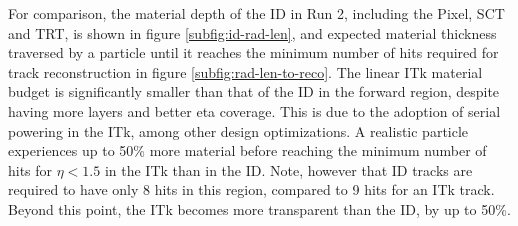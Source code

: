 For comparison, the material depth of the ID in Run 2, including the Pixel, SCT and TRT, is shown in figure \ref{subfig:id-rad-len}, and expected material thickness traversed by a particle until it reaches the minimum number of hits required for track reconstruction in figure \ref{subfig:rad-len-to-reco}. 
The linear ITk material budget is significantly smaller than that of the ID in the forward region, despite having more layers and better eta coverage. 
This is due to the adoption of serial powering in the ITk, among other design optimizations. 
A realistic particle experiences up to 50\% more material before reaching the minimum number of hits for $\eta<1.5$ in the ITk than in the ID. 
Note, however that ID tracks are required to have only 8 hits in this region, compared to 9 hits for an ITk track. 
Beyond this point, the ITk becomes more transparent than the ID, by up to 50\%. 

